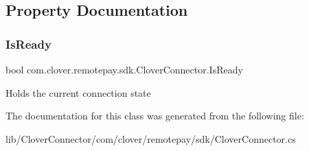 \subsection{Property Documentation}
\mbox{\label{classcom_1_1clover_1_1remotepay_1_1sdk_1_1_clover_connector_ad73c9809998af8cc9f8f61d8b4ec4e7b}} 
\subsubsection{\texorpdfstring{Is\+Ready}{IsReady}}
{\footnotesize\ttfamily bool com.\+clover.\+remotepay.\+sdk.\+Clover\+Connector.\+Is\+Ready\hspace{0.3cm}{\ttfamily [get]}}



Holds the current connection state 



The documentation for this class was generated from the following file\+:\begin{DoxyCompactItemize}
\item 
lib/\+Clover\+Connector/com/clover/remotepay/sdk/Clover\+Connector.\+cs\end{DoxyCompactItemize}
